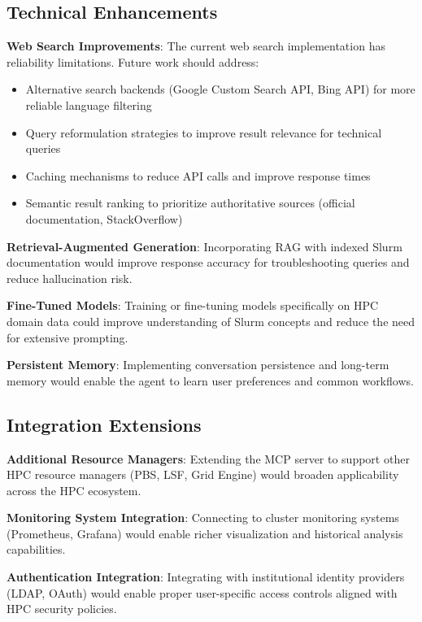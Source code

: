 \subsection{Technical Enhancements}

\textbf{Web Search Improvements}: The current web search implementation has reliability limitations. Future work should address:
\begin{itemize}
    \item Alternative search backends (Google Custom Search API, Bing API) for more reliable language filtering
    \item Query reformulation strategies to improve result relevance for technical queries
    \item Caching mechanisms to reduce API calls and improve response times
    \item Semantic result ranking to prioritize authoritative sources (official documentation, StackOverflow)
\end{itemize}

\textbf{Retrieval-Augmented Generation}: Incorporating RAG with indexed Slurm documentation would improve response accuracy for troubleshooting queries and reduce hallucination risk.

\textbf{Fine-Tuned Models}: Training or fine-tuning models specifically on HPC domain data could improve understanding of Slurm concepts and reduce the need for extensive prompting.

\textbf{Persistent Memory}: Implementing conversation persistence and long-term memory would enable the agent to learn user preferences and common workflows.

\subsection{Integration Extensions}

\textbf{Additional Resource Managers}: Extending the MCP server to support other HPC resource managers (PBS, LSF, Grid Engine) would broaden applicability across the HPC ecosystem.

\textbf{Monitoring System Integration}: Connecting to cluster monitoring systems (Prometheus, Grafana) would enable richer visualization and historical analysis capabilities.

\textbf{Authentication Integration}: Integrating with institutional identity providers (LDAP, OAuth) would enable proper user-specific access controls aligned with HPC security policies.

